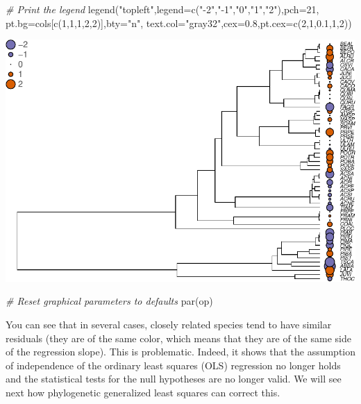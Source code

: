 \documentclass[
]{book}
\newenvironment{Shaded}{\begin{snugshade}}{\end{snugshade}}
\newcommand{\AttributeTok}[1]{\textcolor[rgb]{0.77,0.63,0.00}{#1}}
\newcommand{\CommentTok}[1]{\textcolor[rgb]{0.56,0.35,0.01}{\textit{#1}}}
\newcommand{\DecValTok}[1]{\textcolor[rgb]{0.00,0.00,0.81}{#1}}
\newcommand{\FloatTok}[1]{\textcolor[rgb]{0.00,0.00,0.81}{#1}}
\newcommand{\FunctionTok}[1]{\textcolor[rgb]{0.00,0.00,0.00}{#1}}
\newcommand{\NormalTok}[1]{#1}
\newcommand{\StringTok}[1]{\textcolor[rgb]{0.31,0.60,0.02}{#1}}
\begin{document}
\begin{Shaded}
\begin{Highlighting}[]
\CommentTok{\# Print the legend}
\FunctionTok{legend}\NormalTok{(}\StringTok{"topleft"}\NormalTok{,}\AttributeTok{legend=}\FunctionTok{c}\NormalTok{(}\StringTok{"{-}2"}\NormalTok{,}\StringTok{"{-}1"}\NormalTok{,}\StringTok{"0"}\NormalTok{,}\StringTok{"1"}\NormalTok{,}\StringTok{"2"}\NormalTok{),}\AttributeTok{pch=}\DecValTok{21}\NormalTok{,}
       \AttributeTok{pt.bg=}\NormalTok{cols[}\FunctionTok{c}\NormalTok{(}\DecValTok{1}\NormalTok{,}\DecValTok{1}\NormalTok{,}\DecValTok{1}\NormalTok{,}\DecValTok{2}\NormalTok{,}\DecValTok{2}\NormalTok{)],}\AttributeTok{bty=}\StringTok{"n"}\NormalTok{,}
       \AttributeTok{text.col=}\StringTok{"gray32"}\NormalTok{,}\AttributeTok{cex=}\FloatTok{0.8}\NormalTok{,}\AttributeTok{pt.cex=}\FunctionTok{c}\NormalTok{(}\DecValTok{2}\NormalTok{,}\DecValTok{1}\NormalTok{,}\FloatTok{0.1}\NormalTok{,}\DecValTok{1}\NormalTok{,}\DecValTok{2}\NormalTok{))}
\end{Highlighting}
\end{Shaded}

\begin{center}\includegraphics{pcm-workshop_files/figure-latex/Residuals of lm on phylogeny-1} \end{center}

\begin{Shaded}
\begin{Highlighting}[]
\CommentTok{\# Reset graphical parameters to defaults}
\FunctionTok{par}\NormalTok{(op) }
\end{Highlighting}
\end{Shaded}

You can see that in several cases, closely related species tend to have similar residuals (they are of the same color, which means that they are of the same side of the regression slope). This is problematic. Indeed, it shows that the assumption of independence of the ordinary least squares (OLS) regression no longer holds and the statistical tests for the null hypotheses are no longer valid. We will see next how phylogenetic generalized least squares can correct this.
\end{document}
